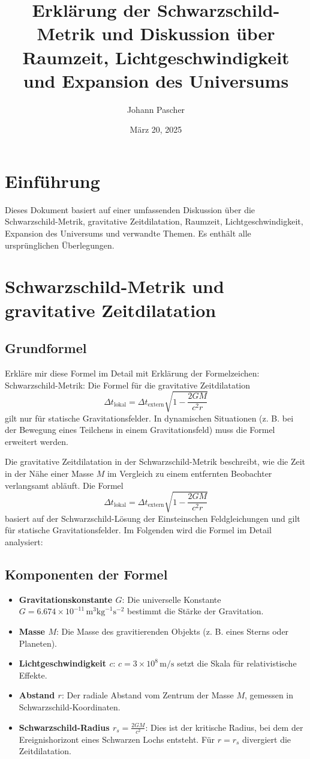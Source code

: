 \documentclass[a4paper,12pt]{article}
\title{Erklärung der Schwarzschild-Metrik und Diskussion über Raumzeit, Lichtgeschwindigkeit und Expansion des Universums}
\author{Johann Pascher}
\date{März 20, 2025}
\begin{document}
	
	\maketitle
		\tableofcontents %
	\section{Einführung}
	Dieses Dokument basiert auf einer umfassenden Diskussion über die Schwarzschild-Metrik, gravitative Zeitdilatation, Raumzeit, Lichtgeschwindigkeit, Expansion des Universums und verwandte Themen. Es enthält alle ursprünglichen Überlegungen.
	
	\section{Schwarzschild-Metrik und gravitative Zeitdilatation}
	\subsection{Grundformel}
	Erkläre mir diese Formel im Detail mit Erklärung der Formelzeichen: Schwarzschild-Metrik: Die Formel für die gravitative Zeitdilatation
	\[
	\Delta t_{\text{lokal}} = \Delta t_{\text{extern}} \sqrt{1 - \frac{2 G M}{c^2 r}}
	\]
	gilt nur für statische Gravitationsfelder. In dynamischen Situationen (z. B. bei der Bewegung eines Teilchens in einem Gravitationsfeld) muss die Formel erweitert werden.
	
	Die gravitative Zeitdilatation in der Schwarzschild-Metrik beschreibt, wie die Zeit in der Nähe einer Masse \( M \) im Vergleich zu einem entfernten Beobachter verlangsamt abläuft. Die Formel
	\[
	\Delta t_{\text{lokal}} = \Delta t_{\text{extern}} \sqrt{1 - \frac{2 G M}{c^2 r}}
	\]
	basiert auf der Schwarzschild-Lösung der Einsteinschen Feldgleichungen und gilt für statische Gravitationsfelder. Im Folgenden wird die Formel im Detail analysiert:
	
	\subsection{Komponenten der Formel}
	\begin{itemize}
		\item \textbf{Gravitationskonstante \( G \)}: Die universelle Konstante \( G = 6.674 \times 10^{-11} \, \text{m}^3 \text{kg}^{-1} \text{s}^{-2} \) bestimmt die Stärke der Gravitation.
		\item \textbf{Masse \( M \)}: Die Masse des gravitierenden Objekts (z. B. eines Sterns oder Planeten).
		\item \textbf{Lichtgeschwindigkeit \( c \)}: \( c = 3 \times 10^8 \, \text{m/s} \) setzt die Skala für relativistische Effekte.
		\item \textbf{Abstand \( r \)}: Der radiale Abstand vom Zentrum der Masse \( M \), gemessen in Schwarzschild-Koordinaten.
		\item \textbf{Schwarzschild-Radius \( r_s = \frac{2 G M}{c^2} \)}: Dies ist der kritische Radius, bei dem der Ereignishorizont eines Schwarzen Lochs entsteht. Für \( r = r_s \) divergiert die Zeitdilatation.
	\end{itemize}
	
\end{document}
